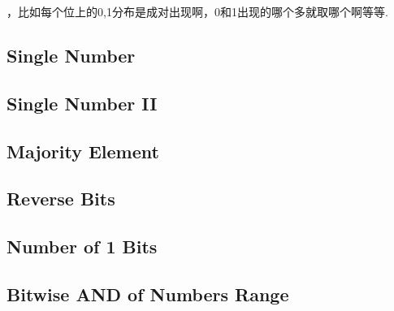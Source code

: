 
，比如每个位上的0,1分布是成对出现啊，0和1出现的哪个多就取哪个啊等等.    
\subsection{Single Number}

\subsection{Single Number II}

\subsection{Majority Element}

\subsection{Reverse Bits}

\subsection{Number of 1 Bits}

\subsection{Bitwise AND of Numbers Range}

